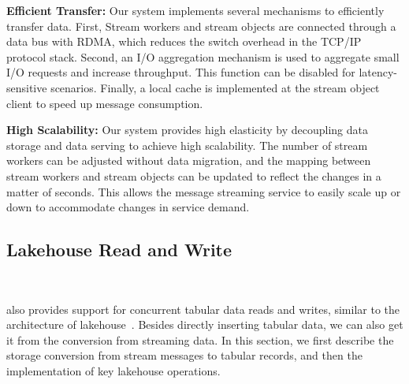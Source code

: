 
\noindent\textbf{Efficient Transfer:} Our system implements several mechanisms to efficiently transfer data. First, Stream workers and stream objects are connected through a data bus with RDMA, which reduces the switch overhead in the TCP/IP protocol stack. Second, an I/O aggregation mechanism is used to aggregate small I/O requests and increase throughput. This function can be disabled for latency-sensitive scenarios. Finally, a local cache is implemented at the stream object client to speed up message consumption.

\noindent\textbf{High Scalability:} Our system provides high elasticity by decoupling data storage and data serving to achieve high scalability. The number of stream workers can be adjusted without data migration, and the mapping between stream workers and stream objects can be updated to reflect the changes in a matter of seconds. This allows the message streaming service to easily scale up or down to accommodate changes in service demand.



\subsection{Lakehouse Read and Write}~\label{subsec:lakehouse}

 \sys also provides support for concurrent tabular data reads and writes, similar to  the architecture of lakehouse~\cite{}.
 Besides directly inserting tabular data, we can also get it from the conversion from streaming data.
  In this section, we first  describe the storage conversion from stream messages to tabular records, and then the implementation of key lakehouse operations.
 

